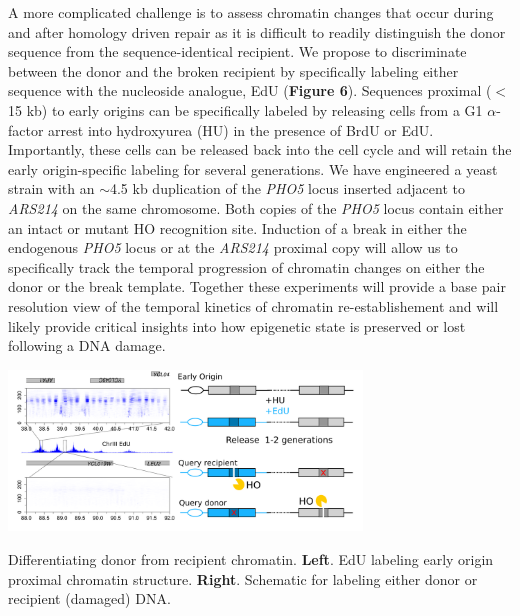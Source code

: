 A more complicated challenge is to assess chromatin changes that occur during and after homology driven repair as %
it is difficult to readily distinguish the donor sequence from the sequence-identical recipient. 
We propose to discriminate between the donor and the broken recipient by specifically labeling either sequence with the nucleoside analogue, EdU ({\color{dukeblue}\textbf{Figure 6}}). Sequences proximal ($<$15 kb) to early origins can be specifically labeled %
by releasing cells from a G1 $\alpha$-factor arrest into hydroxyurea (HU) in the presence of BrdU or EdU\citep{Peace2016-rb,Belsky2015-li}.  Importantly, these cells can be released back into the cell cycle and will retain the early origin-specific labeling for several generations.  We have engineered a yeast strain with an $\sim$4.5 kb duplication of the  \textit{PHO5} locus inserted adjacent to  \textit{ARS214} on the same chromosome.  Both copies of the \textit{PHO5} locus contain either an intact or mutant HO recognition site. Induction of a break in either the endogenous \textit{PHO5} locus or at the \textit{ARS214} proximal copy will allow us to specifically track the temporal progression of chromatin changes on either the donor or the break template.  Together these experiments will provide a base pair resolution view of the temporal kinetics of chromatin re-establishement and will likely provide critical insights into how epigenetic state is preserved or lost following a DNA damage.
\begin{floatingfigure}[l]{3.7in}
\vspace{-5mm}
\begin{center}
\includegraphics[width=3.7in]{r35_figures/edu_schematic_27.png}
\end{center}
\vspace{7mm}
\caption{Differentiating donor from recipient chromatin.  \textbf{Left}. EdU labeling early origin proximal chromatin structure.  \textbf{Right}.  Schematic for labeling either donor or recipient (damaged) DNA. }%
\end{floatingfigure}


